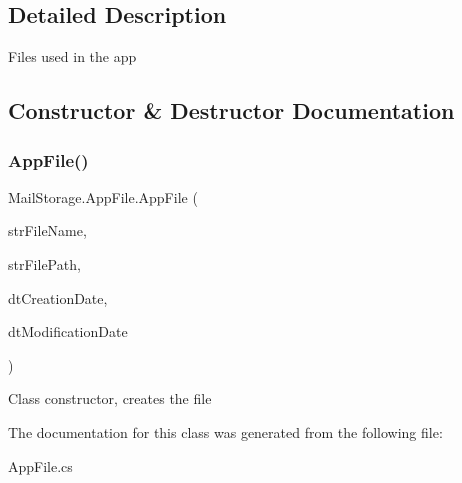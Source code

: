 \subsection{Detailed Description}
Files used in the app 



\subsection{Constructor \& Destructor Documentation}
\mbox{\label{class_mail_storage_1_1_app_file_a7d30bfd52976376bf98a71d7f0f2941d}} 
\subsubsection{\texorpdfstring{App\+File()}{AppFile()}}
{\footnotesize\ttfamily Mail\+Storage.\+App\+File.\+App\+File (\begin{DoxyParamCaption}\item[{string}]{str\+File\+Name,  }\item[{string}]{str\+File\+Path,  }\item[{Date\+Time}]{dt\+Creation\+Date,  }\item[{Date\+Time}]{dt\+Modification\+Date }\end{DoxyParamCaption})}



Class constructor, creates the file 



The documentation for this class was generated from the following file\+:\begin{DoxyCompactItemize}
\item 
App\+File.\+cs\end{DoxyCompactItemize}
